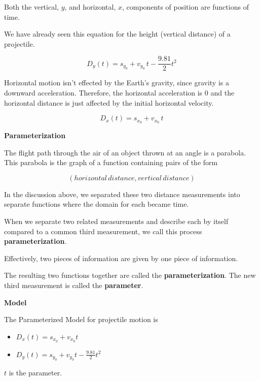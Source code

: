 \documentclass{ximera}
\begin{document}
Both the vertical, $y$, and horizontal, $x$, components of position are functions of time.

We have already seen this equation for the height (vertical distance) of a projectile.

\[ 
D_y(t) = s_{y_0} + v_{y_0} \, t - \frac{9.81}{2} t^2  
\]

Horizontal motion isn't effected by the Earth's gravity, since gravity is a downward acceleration. Therefore, the horizontal acceleration is $0$ and the horizontal distance is just affected by the initial horizontal velocity.


\[ 
D_x(t) = s_{x_0} + v_{x_0} \, t  
\]






\begin{definition} \textbf{\textcolor{green!50!black}{Parameterization}} 

The flight path through the air of an object thrown at an angle is a parabola.  This parabola is the graph of a function containing pairs of the form 

\[ (horizontal \, distance, vertical \,distance) \]

In the discussion above, we separated these two distance measurements into separate functions where the domain for each became time.



When we separate two related measurements and describe each by itself compared to a common third measurement, we call this process \textbf{parameterization}.  

Effectively, two pieces of information are given by one piece of information.


The resulting two functions together are called the \textbf{parameterization}.  The new third measurement is called the \textbf{parameter}.





\textbf{\textcolor{purple!30!blue}{Model}} 


The Parameterized Model for projectile motion is


\begin{itemize}
\item $D_x(t) = s_{x_0} + v_{x_0} t$
\item $D_y(t) = s_{y_0} + v_{y_0} t - \frac{9.81}{2} t^2$
\end{itemize}

$t$ is the parameter.




\end{definition}
\end{document}
